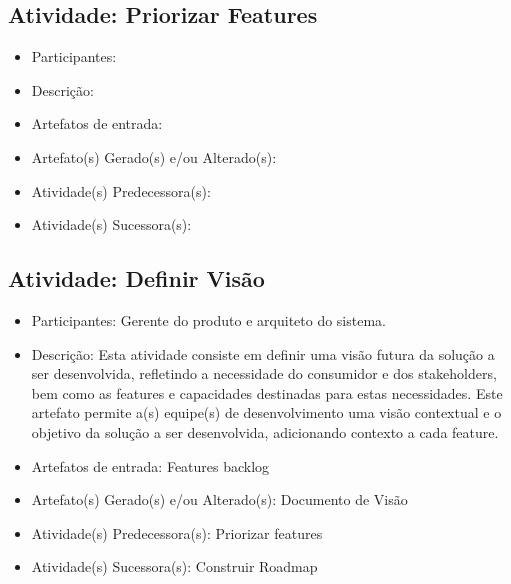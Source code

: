 \subsection{Atividade: Priorizar Features}
\begin{itemize}
\item Participantes: 

\item Descrição: 

\item Artefatos de entrada: 

\item Artefato(s) Gerado(s) e/ou Alterado(s): 

\item Atividade(s) Predecessora(s): 
  
\item Atividade(s) Sucessora(s): 
\end{itemize}


\subsection{Atividade: Definir Visão}
\begin{itemize}
\item Participantes: Gerente do produto e arquiteto do sistema. 

\item Descrição: Esta atividade consiste em definir uma visão futura da solução a ser desenvolvida, refletindo a necessidade do consumidor e dos stakeholders, bem como as features e capacidades destinadas para estas necessidades.\cite{SAFe} Este artefato permite a(s) equipe(s) de desenvolvimento uma visão contextual e o objetivo da solução a ser desenvolvida, adicionando contexto a cada feature. 

\item Artefatos de entrada: Features backlog

\item Artefato(s) Gerado(s) e/ou Alterado(s): Documento de Visão

\item Atividade(s) Predecessora(s): Priorizar features
  
\item Atividade(s) Sucessora(s): Construir Roadmap
\end{itemize}


